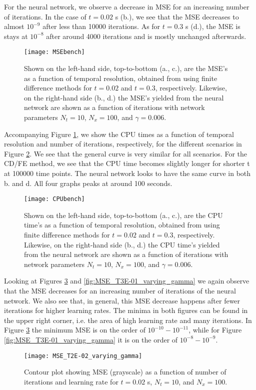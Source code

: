 For the neural network, we observe a decrease in MSE for an increasing number of iterations. In the case of $t=0.02$ s (b.), we see that the MSE decreases to almost $10^{-9}$ after less than 10000 iterations. As for $t=0.3$ s (d.), the MSE is stays at $10^{-8}$ after around 4000 iterations and is mostly unchanged afterwards.
\begin{figure}[htbp]
 	\centering
 	\texttt{[image: MSEbench]}
  \caption{Shown on the left-hand side, top-to-bottom (a., c.), are the MSE's as a function of temporal resolution, obtained from using finite difference methods for $t=0.02$ and $t=0.3$, respectively. Likewise, on the right-hand side (b., d.) the MSE's yielded from the neural network are shown as a function of iterations with network parameters $N_t = 10$, $N_x = 100$, and $\gamma = 0.006$.}
  \label{fig:MSEbench}
\end{figure}

Accompanying Figure \ref{fig:MSEbench}, we show the CPU times as a function of temporal resolution and number of iterations, respectively, for the different scenarios in Figure \ref{fig:CPUbench}. We see that the general curve is very similar for all scenarios. For the CD/FE method, we see that the CPU time becomes slightly longer for shorter t at 100000 time points. The neural network looks to have the same curve in both b. and d. All four graphs peaks at around 100 seconds.
\begin{figure}[htbp]
 	\centering
 	\texttt{[image: CPUbench]}
 	\caption{Shown on the left-hand side, top-to-bottom (a., c.), are the CPU time's as a function of temporal resolution, obtained from using finite difference methods for $t=0.02$ and $t=0.3$, respectively. Likewise, on the right-hand side (b., d.) the CPU time's yielded from the neural network are shown as a function of iterations with network parameters $N_t = 10$, $N_x = 100$, and $\gamma = 0.006$.}
  \label{fig:CPUbench}
\end{figure}

Looking at Figures \ref{fig:MSE_T2E-02_varying_gamma} and \ref{fig:MSE_T3E-01_varying_gamma} we again observe that the MSE decreases for an increasing number of iterations of the neural network. We also see that, in general, this MSE decrease happens after fewer iterations for higher learning rates. The minima in both figures can be found in the upper right corner, i.e. the area of high learning rate and many iterations. In Figure \ref{fig:MSE_T2E-02_varying_gamma} the minimum MSE is on the order of $10^{-10} - 10^{-11}$, while for Figure \ref{fig:MSE_T3E-01_varying_gamma} it is on the order of $10^{-8} - 10^{-9}$.
\begin{figure}[htbp]
 	\centering
 	\texttt{[image: MSE\_T2E-02\_varying\_gamma]}
 	\caption{Contour plot showing MSE (grayscale) as a function of number of iterations and learning rate for $t=0.02$ s, $N_t = 10$, and $N_x = 100$.}
  \label{fig:MSE_T2E-02_varying_gamma}
\end{figure}

